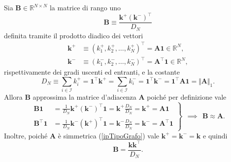       \begin{dfn}
        \label{defMatriceGradi}
        Sia \(\mathbf B\in\mathbb R^{N\times N}\) la matrice di rango uno
        \[
          \mathbf B\equiv\frac{\mathbf k^+(\mathbf k^-)^\top}{D_N}
        \]
        definita tramite il prodotto diadico dei vettori
        \[
          \begin{aligned}
            \mathbf k^+&\equiv(k^+_1,k^+_2,\ldots,k^+_N)^\top=\mathbf A\mathbf 1\in\mathbb R^N,\\
            \mathbf k^-&\equiv(k^-_1,k^-_2,\ldots,k^-_N)^\top=\mathbf A^\top\mathbf 1\in\mathbb R^N,
          \end{aligned}
        \]
        rispettivamente dei gradi uscenti ed entranti, e la costante\footnotemark{}%
        \begin{equation}
          \label{eqNormaUnoMatriceAdiacenza}
          D_N\equiv\sum_{i\in\mathcal I}k^+_i=\mathbf1^\top\mathbf k^+
          =\sum_{i\in\mathcal I}k^-_i=\mathbf1^\top\mathbf k^-
          =\mathbf1^\top\mathbf A\mathbf1=\Vert\mathbf A\Vert_1.
        \end{equation}
        Allora \(\mathbf B\) approssima la matrice d'adiacenza \(\mathbf A\) poiché per definizione vale 
        \begin{equation}
          \label{eqCriterioApprossimazioneA}
          \left.\begin{aligned}
            \mathbf B\mathbf1
            &=\frac1{D_N}\mathbf k^+(\mathbf k^-)^\top\mathbf1
            =\mathbf k^+\frac{D_N}{D_N}=\mathbf k^+=\mathbf A\mathbf1\\
            \mathbf B^\top\mathbf1
            &=\frac1{D_N}\mathbf k^-(\mathbf k^+)^\top\mathbf1
            =\mathbf k^-\frac{D_N}{D_N}=\mathbf k^-=\mathbf A^\top\mathbf1
          \end{aligned}\right\}
          \ \ \implies\ \ \mathbf B\approx\mathbf A.
        \end{equation}
        Inoltre, poiché \(\mathbf A\) è simmetrica (\cref{ipTipoGrafo}) vale \(\mathbf k^+=\mathbf k^-=\mathbf k\) e quindi
        \[
          \mathbf B=\frac{\mathbf k\mathbf k^\top}{D_N}.
        \]
      \end{dfn}
      
